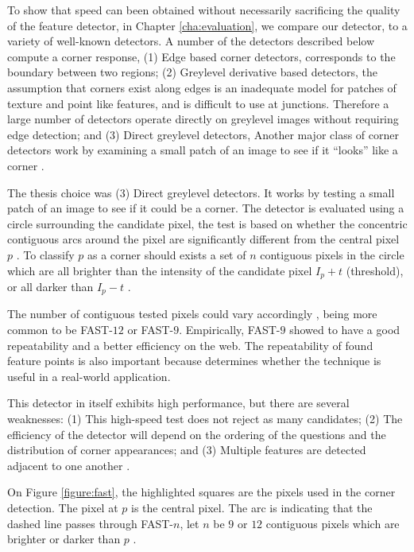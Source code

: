 To show that speed can been obtained without necessarily sacrificing the quality of the feature detector, in Chapter \ref{cha:evaluation}, we compare our detector, to a variety of well-known detectors. A number of the detectors described below compute a corner response, (1) Edge based corner detectors, corresponds to the boundary between two regions; (2) Greylevel derivative based detectors, the assumption that corners exist along edges is an inadequate model for patches of texture and point like features, and is difficult to use at junctions. Therefore a large number of detectors operate directly on greylevel images without requiring edge detection; and (3) Direct greylevel detectors, Another major class of corner detectors work by examining a small patch of an image to see if it ``looks'' like a corner \cite{Rosten2010}.

The thesis choice was (3) Direct greylevel detectors. It works by testing a small patch of an image to see if it could be a corner. The detector is evaluated using a circle surrounding the candidate pixel, the test is based on whether the concentric contiguous arcs around the pixel are significantly different from the central pixel $p$ \cite{Rosten2010}. To classify $p$ as a corner should exists a set of $n$ contiguous pixels in the circle which are all brighter than the intensity of the candidate pixel $I_{p} + t$ (threshold), or all darker than $I_{p} - t$ \cite{Rosten2010}.

The number of contiguous tested pixels could vary accordingly \cite{Rosten2010}, being more common to be FAST-$12$ or FAST-$9$. Empirically, FAST-$9$ showed to have a good repeatability and a better efficiency on the web. The repeatability of found feature points is also important because determines whether the technique is useful in a real-world application.

This detector in itself exhibits high performance, but there are several weaknesses: (1) This high-speed test does not reject as many candidates; (2) The efficiency of the detector will depend on the ordering of the questions and the distribution of corner appearances; and (3) Multiple features are detected adjacent to one another \cite{Rosten2010}.

On Figure \ref{figure:fast}, the highlighted squares are the pixels used in the corner detection. The pixel at $p$ is the central pixel. The arc is indicating that the dashed line passes through FAST-$n$, let $n$ be $9$ or $12$ contiguous pixels which are brighter or darker than $p$ \cite{Rosten2010}.

